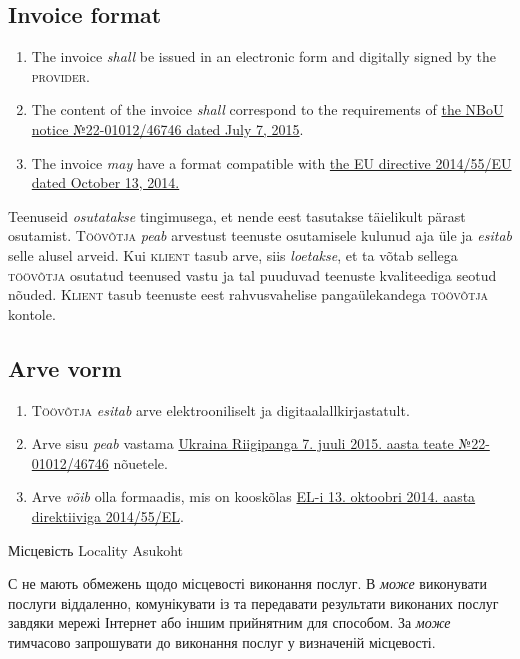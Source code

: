\begin{Form}
\begin{paracol}{3}
{        \subsection{Invoice format}
        \begin{enumerate}
          \item The invoice \textit{shall} be issued in an electronic form and digitally signed by the \textsc{provider}.
          \item The content of the invoice \textit{shall} correspond to the requirements of \href{http://bank.gov.ua/doccatalog/document?id=19208488}{the NBoU notice №22-01012/46746 dated July 7, 2015}.
          \item The invoice \textit{may} have a format compatible with \href{http://eur-lex.europa.eu/legal-content/EN/TXT/?uri=CELEX:32014L0055}{the EU directive 2014/55/EU dated October 13, 2014.}
        \end{enumerate}
        }
        {Teenuseid \emph{osutatakse} tingimusega, et nende eest tasutakse täielikult pärast osutamist. T\textsc{öövõtja} \emph{peab} arvestust teenuste osutamisele kulunud aja üle ja \emph{esitab} selle alusel arveid. Kui \textsc{klient} tasub arve, siis \emph{loetakse}, et ta võtab sellega \textsc{töövõtja} osutatud teenused vastu ja tal puuduvad teenuste kvaliteediga seotud nõuded. K\textsc{lient} tasub teenuste eest rahvusvahelise pangaülekandega \textsc{töövõtja} kontole.

        \subsection{Arve vorm}
        \begin{enumerate}
          \item T\textsc{öövõtja} \emph{esitab} arve elektrooniliselt ja digitaalallkirjastatult.\\
          \item Arve sisu \emph{peab} vastama \href{http://bank.gov.ua/doccatalog/document?id=19208488}{Ukraina Riigipanga 7. juuli 2015. aasta teate №22-01012/46746} nõuetele.\\
          \item Arve \emph{võib} olla formaadis, mis on kooskõlas \href{http://eur-lex.europa.eu/legal-content/EN/TXT/?uri=CELEX:32014L0055}{EL-i 13. oktoobri 2014. aasta direktiiviga 2014/55/EL}.\\
        \end{enumerate}
        }
      \clause
        {Місцевість}
        {Locality}
        {Asukoht}
        {С не мають обмежень щодо місцевості виконання послуг. В \textit{може} виконувати послуги віддаленно, комунікувати із  та передавати результати виконаних послуг завдяки мережі Інтернет або іншим прийнятним для  способом. За   \textit{може} тимчасово запрошувати  до виконання послуг у визначеній  місцевості.

}
\end{paracol}
\end{Form}
